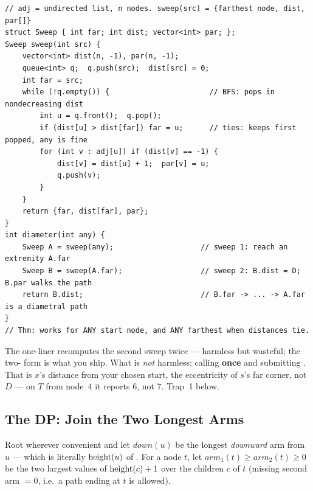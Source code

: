 \begin{lstlisting}[caption={The two sweeps: one BFS (or DFS) distance pass, called twice; also returns the far node for path recovery}, label={lst:c09-sweep}]
// adj = undirected list, n nodes. sweep(src) = {farthest node, dist, par[]}
struct Sweep { int far; int dist; vector<int> par; };
Sweep sweep(int src) {
    vector<int> dist(n, -1), par(n, -1);
    queue<int> q;  q.push(src);  dist[src] = 0;
    int far = src;
    while (!q.empty()) {                       // BFS: pops in nondecreasing dist
        int u = q.front();  q.pop();
        if (dist[u] > dist[far]) far = u;      // ties: keeps first popped, any is fine
        for (int v : adj[u]) if (dist[v] == -1) {
            dist[v] = dist[u] + 1;  par[v] = u;
            q.push(v);
        }
    }
    return {far, dist[far], par};
}
int diameter(int any) {
    Sweep A = sweep(any);                    // sweep 1: reach an extremity A.far
    Sweep B = sweep(A.far);                  // sweep 2: B.dist = D; B.par walks the path
    return B.dist;                           // B.far -> ... -> A.far is a diametral path
}
// Thm: works for ANY start node, and ANY farthest when distances tie.
\end{lstlisting}

\begin{warningbox}
The one-liner  recomputes the second sweep
twice --- harmless but wasteful; the two- form is what you ship. What is
\emph{not} harmless: calling  \textbf{once} and submitting .
That is $x$'s distance from your chosen start, the eccentricity of $s$'s far corner, not
$D$ --- on $T$ from node~$4$ it reports $6$, not $7$. Trap~1 below.
\end{warningbox}

\subsection{The DP: Join the Two Longest Arms}

Root wherever convenient and let $\mathit{down}(u)$ be the longest \emph{downward} arm
from $u$ --- which is literally $\operatorname{height}(u)$ of . For a node $t$,
let $\mathit{arm}_1(t) \ge \mathit{arm}_2(t) \ge 0$ be the two largest values of
$\operatorname{height}(c)+1$ over the children $c$ of $t$ (missing second arm $=0$, i.e.\ a path
ending at $t$ is allowed).

